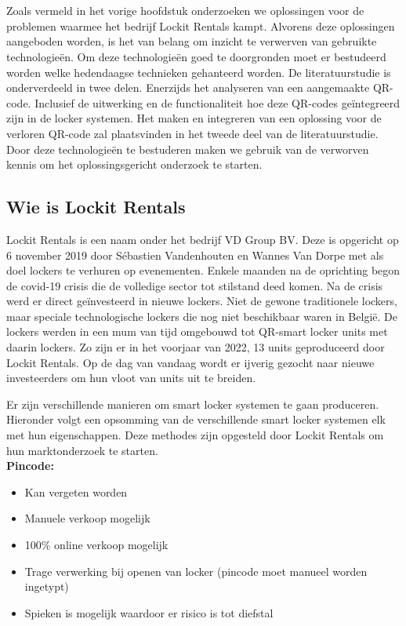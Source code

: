 \chapter{}%
\label{ch:stand-van-zaken}

Zoals vermeld in het vorige hoofdstuk onderzoeken we oplossingen voor de problemen waarmee het bedrijf Lockit Rentals kampt. Alvorens deze oplossingen aangeboden worden, is het van belang om inzicht te verwerven van gebruikte technologieën. Om deze technologieën goed te doorgronden moet er bestudeerd worden welke hedendaagse technieken gehanteerd worden. De literatuurstudie is onderverdeeld in twee delen. Enerzijds het analyseren van een aangemaakte QR-code. Inclusief de uitwerking en de functionaliteit hoe deze QR-codes geïntegreerd zijn in de locker systemen. Het maken en integreren van een oplossing voor de verloren QR-code zal plaatsvinden in het tweede deel van de literatuurstudie. Door deze technologieën te bestuderen maken we gebruik van de verworven kennis om het oplossingsgericht onderzoek te starten.

\section{Wie is Lockit Rentals}%
\label{sec:lockitRentals}


Lockit Rentals is een naam onder het bedrijf VD Group BV. Deze is opgericht op 6 november 2019 door Sébastien Vandenhouten en Wannes Van Dorpe met als doel lockers te verhuren op evenementen. Enkele maanden na de oprichting begon de covid-19 crisis die de volledige sector tot stilstand deed komen. Na de crisis werd er direct geïnvesteerd in nieuwe lockers. Niet de gewone traditionele lockers, maar speciale technologische lockers die nog niet beschikbaar waren in België. De lockers werden in een mum van tijd omgebouwd tot QR-smart locker units met daarin lockers. Zo zijn er in het voorjaar van 2022, 13 units geproduceerd door Lockit Rentals. Op de dag van vandaag wordt er ijverig gezocht naar nieuwe investeerders om hun vloot van units uit te breiden.

Er zijn verschillende manieren om smart locker systemen te gaan produceren. Hieronder volgt een opsomming van de verschillende smart locker systemen elk met hun eigenschappen. Deze methodes zijn opgesteld door Lockit Rentals om hun marktonderzoek te starten.
\\
\textbf{Pincode:}
\begin{itemize}
    \item Kan vergeten worden
    \item Manuele verkoop mogelijk
    \item 100\% online verkoop mogelijk
    \item Trage verwerking bij openen van locker (pincode moet manueel worden ingetypt)
    \item Spieken is mogelijk waardoor er risico is tot diefstal    
\end{itemize}

